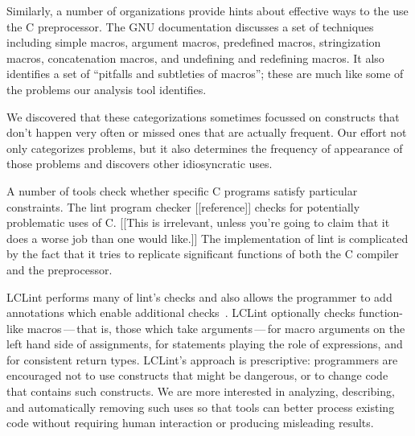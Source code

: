 \documentclass[11pt]{article}
\begin{document}
Similarly, a number of organizations provide hints about effective ways to
the use the C preprocessor.  The GNU documentation discusses
a set of techniques including simple macros, argument macros, predefined
macros, stringization macros, concatenation macros, and undefining and
redefining macros.  It also identifies a set of ``pitfalls and subtleties
of macros''; these are much like some of the problems our analysis tool
identifies.

We discovered that these categorizations sometimes focussed on constructs
that don't happen very often or missed ones that are actually frequent.
Our effort not only categorizes problems, but it also determines the
frequency of appearance of those problems and discovers other idiosyncratic
uses.

A number of tools check whether specific C programs satisfy particular
constraints.  The lint program checker [[reference]]
checks for potentially problematic uses of C\@.  
[[This is irrelevant, unless you're going to claim that it does a worse job
than one would like.]]
The implementation of lint
is complicated by the fact that it tries to replicate significant functions
of both the C compiler and the preprocessor.

LCLint performs many of lint's checks and also
allows the programmer to add annotations which enable additional
checks~\cite{Evans-pldi96,Evans-fse94}.
LCLint optionally checks function-like
macros\,---\,that is, those which take arguments\,---\,for
macro arguments on the left hand side of assignments, for statements
playing the role of expressions, and for consistent return types.
LCLint's approach is prescriptive: programmers are encouraged not to use
constructs that might be dangerous, or to change code that contains such
constructs.  We are more interested in analyzing, describing, and
automatically removing such uses so that tools can better process existing
code without requiring human interaction or producing misleading results.
\end{document}

